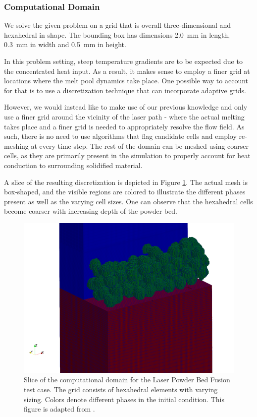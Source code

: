 \documentclass[asi,article,submit,moreauthors]{Definitions/mdpi}
\begin{document}
\subsubsection{Computational Domain}

We solve the given problem on a grid that is overall three-dimensional and hexahedral in shape.
The bounding box has dimensions \SI{2.0}{\milli\metre} in length, \SI{0.3}{\milli\metre} in width and \SI{0.5}{\milli\metre} in height.

In this problem setting, steep temperature gradients are to be expected due to the concentrated heat input.
As a result, it makes sense to employ a finer grid at locations where the melt pool dynamics take place.
One possible way to account for that is to use a discretization technique that can incorporate adaptive grids.

However, we would instead like to make use of our previous knowledge and only use a finer grid around the vicinity of the laser path - where the actual melting takes place and a finer grid is needed to appropriately resolve the flow field.
As such, there is no need to use algorithms that flag candidate cells and employ re-meshing at every time step.
The rest of the domain can be meshed using coarser cells, as they are primarily present in the simulation to properly account for heat conduction to surrounding solidified material.

A slice of the resulting discretization is depicted in Figure \ref{fig:lpbf-mesh}.
The actual mesh is box-shaped, and the visible regions are colored to illustrate the different phases present as well as the varying cell sizes.
One can observe that the hexahedral cells become coarser with increasing depth of the powder bed.

\begin{figure}[htbp!]
    \centering
    \includegraphics[width=0.6\linewidth]{Figs/Results/powderbed.png}
    \caption{Slice of the computational domain for the Laser Powder Bed Fusion test case. The grid consists of hexahedral elements with varying sizing. Colors denote different phases in the initial condition. This figure is adapted from \cite{zimbrodEfficientSimulationComplex2022}.}
    \label{fig:lpbf-mesh}
\end{figure}
\end{document}
